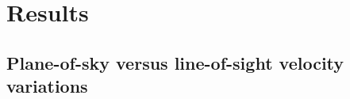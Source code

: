 \documentclass[useAMS,usenatbib]{mn2e}
\begin{document}
\newcommand\fakesc[1]{\protect\scalebox{1.0}[0.8]{#1}}
\newcommand\ION[2]{\ensuremath{\mathrm{#1\,\fakesc{#2}}}}
\newcommand\ion[2]{\setcounter{ion}{#2}\ION{#1}{\Roman{ion}}}
\newcommand\hii{\ion{H}{2}}
\newcommand\oiii{[\ion{O}{3}]}
\newcommand\nii{[\ion{N}{2}]}
\newcommand\sii{[\ion{S}{2}]}
\newcommand\siii{[\ion{S}{3}]}
\newcommand\ha{\ensuremath{\mathrm{H\alpha}}}
\newcommand\kms{\ensuremath{\mathrm{km\ s^{-1}}}}
\newcommand\los{\ensuremath{_{\mathrm{los}}}}
\newcommand\pos{\ensuremath{_{\mathrm{pos}}}}
\newcommand\obs{\ensuremath{_{\mathrm{obs}}}}
\newcommand\ins{\ensuremath{_{\mathrm{ins}}}}
\newcommand\rms{\ensuremath{_{\mathrm{rms}}}}
\newcommand\FS{\ensuremath{_{\mathrm{fs}}}}
\newcommand\therm{\ensuremath{_{\mathrm{therm}}}}
\addtocounter{section}{2}
\section{Results}
\addtocounter{subsection}{2}
\subsection{Plane-of-sky versus line-of-sight velocity variations}
\label{sec:plane-sky-versus}

 
\end{document}
